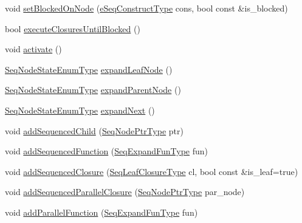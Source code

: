\begin{DoxyCompactItemize}
\item 
void \hyperlink{structvt_1_1seq_1_1_seq_node_a9ae8d493bc9466e50ed56c40ce627f38}{set\+Blocked\+On\+Node} (\hyperlink{namespacevt_1_1seq_a3041a01a5db2bccb3183e73b49e78252}{e\+Seq\+Construct\+Type} cons, bool const \&is\+\_\+blocked)
\item 
bool \hyperlink{structvt_1_1seq_1_1_seq_node_a0480bcf54d90650d5678388bcb33bcb7}{execute\+Closures\+Until\+Blocked} ()
\item 
void \hyperlink{structvt_1_1seq_1_1_seq_node_af4fbe1402c630a691643b04bc1651ba1}{activate} ()
\item 
\hyperlink{namespacevt_1_1seq_ad7b0496818667d816e00f717491d3b92}{Seq\+Node\+State\+Enum\+Type} \hyperlink{structvt_1_1seq_1_1_seq_node_a579a9f1958bdd51915abc25f61fa1e5f}{expand\+Leaf\+Node} ()
\item 
\hyperlink{namespacevt_1_1seq_ad7b0496818667d816e00f717491d3b92}{Seq\+Node\+State\+Enum\+Type} \hyperlink{structvt_1_1seq_1_1_seq_node_ac4cc38f1b735fbb58a0e610391f77c35}{expand\+Parent\+Node} ()
\item 
\hyperlink{namespacevt_1_1seq_ad7b0496818667d816e00f717491d3b92}{Seq\+Node\+State\+Enum\+Type} \hyperlink{structvt_1_1seq_1_1_seq_node_a73acc7cce4561dff26b900f8785add5f}{expand\+Next} ()
\item 
void \hyperlink{structvt_1_1seq_1_1_seq_node_a7554b8cdfe9a983d937554979505b76e}{add\+Sequenced\+Child} (\hyperlink{namespacevt_1_1seq_ae6a4874b585be0612aaca32ca6d2d191}{Seq\+Node\+Ptr\+Type} ptr)
\item 
void \hyperlink{structvt_1_1seq_1_1_seq_node_aa1d4558f9d457a5368c0ea651efc806e}{add\+Sequenced\+Function} (\hyperlink{namespacevt_1_1seq_ab345c700c06d135cafba39f711767ad5}{Seq\+Expand\+Fun\+Type} fun)
\item 
void \hyperlink{structvt_1_1seq_1_1_seq_node_a374eeb2288505547195a5a4d97ba5dbf}{add\+Sequenced\+Closure} (\hyperlink{namespacevt_1_1seq_a13c76fb1c62795dfd2d359b2dde35e8a}{Seq\+Leaf\+Closure\+Type} cl, bool const \&is\+\_\+leaf=true)
\item 
void \hyperlink{structvt_1_1seq_1_1_seq_node_a94c5bef1a9886372f4109d39ee66e8bc}{add\+Sequenced\+Parallel\+Closure} (\hyperlink{namespacevt_1_1seq_ae6a4874b585be0612aaca32ca6d2d191}{Seq\+Node\+Ptr\+Type} par\+\_\+node)
\item 
void \hyperlink{structvt_1_1seq_1_1_seq_node_adfe191e3f7ff499909c222cd4dbc3525}{add\+Parallel\+Function} (\hyperlink{namespacevt_1_1seq_ab345c700c06d135cafba39f711767ad5}{Seq\+Expand\+Fun\+Type} fun)
\item 

\end{DoxyCompactItemize}
